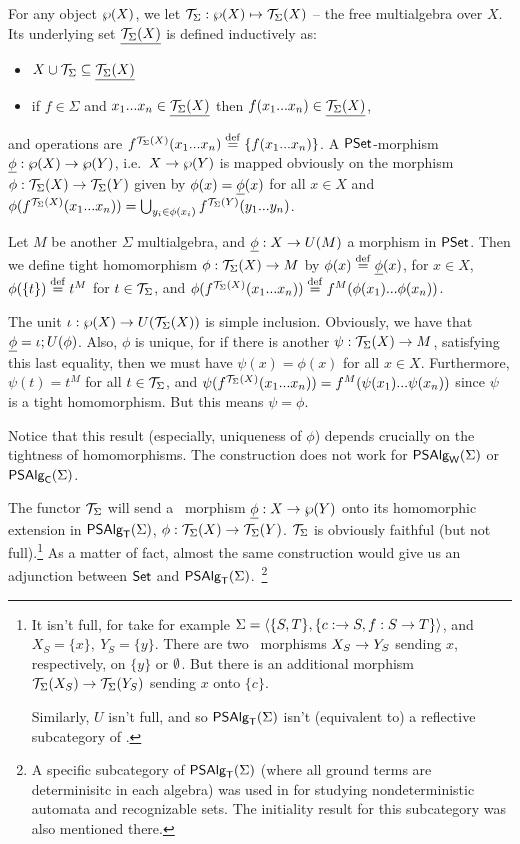 \documentclass[10pt]{article}
\begin{document}
\begin{Proof}
For any object $\wp(X)$, we let ${\cal T}_{\Sigma}:\wp(X)\mapsto {\cal T}_{\Sigma}(X)$
-- the free multialgebra over $X$. Its underlying set $\underline {{\cal T}_{\Sigma}(X)}$ is defined inductively as:

\begin{itemize}\MyLPar
\item 
$X\cup{\cal T}_{\Sigma}\subseteq \underline {{\cal T}_{\Sigma}(X)}$ 
\item 
if $f\in\Sigma$ and $x_1...x_n\in\underline {{\cal T}_{\Sigma}(X)}$ then
$f(x_1...x_n)\in\underline {{\cal T}_{\Sigma}(X)}$,
\end{itemize}

and operations are $f^{{\cal T}_{\Sigma}(X)}(x_1...x_n)\stackrel{{\rm \tiny{def}}}= \{f(x_1...x_n)\}$.
A $\mbox{\rm\sf PSet}$-morphism $\underline {\phi}:\wp(X)\rightarrow\wp(Y)$, i.e.\ 
$X\rightarrow\wp(Y)$ is mapped obviously on the morphism
$\phi:{\cal T}_{\Sigma}(X)\rightarrow{\cal T}_{\Sigma}(Y)$ given by $\phi(x)=\underline {\phi}(x)$ for
all $x\in X$ and $\phi(f^{{\cal T}_{\Sigma}(X)}(x_1...x_n))=
\bigcup_{y_{i}\in\phi(x_{i})}f^{{\cal T}_{\Sigma}(Y)}(y_1...y_n)$.

Let $M$ be another $\Sigma$ multialgebra, and $\underline {\phi}:X\rightarrow U(M)$
a morphism in $\mbox{\rm\sf PSet}$. Then we define tight homomorphism $\phi
:{\cal T}_{\Sigma}(X)\rightarrow M$ by $\phi(x)\stackrel{{\rm \tiny{def}}}=\underline {\phi}(x)$, for $x\in X$,
$\phi(\{t\})\stackrel{{\rm \tiny{def}}}= t^M$ for $t\in{\cal T}_{\Sigma}$, and
$\phi(f^{{\cal T}_{\Sigma}(X)}(x_1...x_n))\stackrel{{\rm \tiny{def}}}= f^M(\phi(x_1)...\phi(x_n))$.

The unit $\iota:\wp(X)\rightarrow U({\cal T}_{\Sigma}(X))$ is simple
inclusion. Obviously, we have that $\underline {\phi} =
\iota;U(\phi)$. Also, $\phi$ is unique, for if there is
another $\psi:{\cal T}_{\Sigma}(X)\rightarrow M$, satisfying this last equality, then
we must have $\psi(x)=\phi(x)$ for all $x\in X$. Furthermore,
$\psi(t)=t^M$ for all $t\in{\cal T}_{\Sigma}$, and
$\psi(f^{{\cal T}_{\Sigma}(X)}(x_1...x_n))=f^M(\psi(x_1)...\psi(x_n))$ since
$\psi$ is a tight homomorphism. But this means $\psi=\phi$.
\end{Proof}

\noindent
Notice that this result (especially, uniqueness of $\phi$) depends
crucially on the tightness of homomorphisms. The construction does not
work for $\mbox{\sf PSAlg}_{\sf W}(\Sigma)$ or $\mbox{\sf PSAlg}_{\sf C}(\Sigma)$.

The functor ${\cal T}_{\Sigma}$ will send a \PSt\ morphism
$\underline {\phi}:X\rightarrow\wp(Y)$ onto its homomorphic extension in
$\mbox{\sf PSAlg}_{\sf T}(\Sigma)$, $\phi:{\cal T}_{\Sigma}(X)\rightarrow {\cal T}_{\Sigma}(Y)$. ${\cal T}_{\Sigma}$ is obviously
faithful (but not full).\footnote{It isn't full, for take for example
$\Sigma=\langle\{S,T\},\{c:\rightarrow S, f:S\rightarrow T\}\rangle$, and $X_S=\{x\},\
Y_S=\{y\}$. There are two \PSt\ morphisms $X_S\rightarrow Y_S$ sending $x$,
respectively, on $\{y\}$ or $\emptyset$.  But there is an additional
morphism ${\cal T}_{\Sigma}(X_S)\rightarrow {\cal T}_{\Sigma}(Y_S)$ sending $x$ onto $\{c\}$.

Similarly, $U$ isn't full, and so $\mbox{\sf PSAlg}_{\sf T}(\Sigma)$ isn't (equivalent to) a
reflective subcategory of \PSt.}  As a matter of fact, almost the same
construction would give us an adjunction between $\mbox{\rm\sf Set}$ and
$\mbox{\sf PSAlg}_{\sf T}(\Sigma)$.~\footnote{A specific subcategory of $\mbox{\sf PSAlg}_{\sf T}(\Sigma)$ (where all
ground terms are determinisitc in each algebra) was used in
\cite{eli:nondetaut} for studying nondeterministic automata and
recognizable sets. The initiality result for this subcategory was also
mentioned there.}
\end{document}
